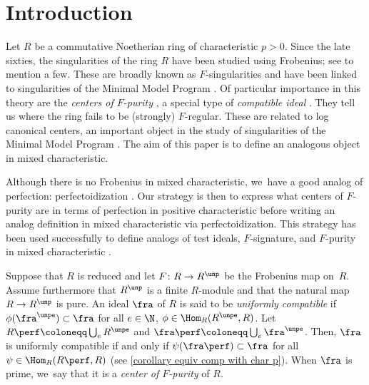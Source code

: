 \section{Introduction}

Let $R$ be a commutative Noetherian ring of characteristic $p>0$. Since the late sixties, the singularities of the ring $R$ have been studied using Frobenius; see \cite{KunzCharacterizationsOfRegularLocalRings,HochsterHunekeTC1,HochsterFoundations,HochsterHunekeTightClosureAndStrongFRegularity,SmithFRatImpliesRat,MehtaRamanathanFrobeniusSplittingAndCohomologyVanishing} to mention a few.
These are broadly known as $F$-singularities and have been linked to singularities of the Minimal Model Program \cite{SchwedeFInjectiveAreDuBois,SmithFRatImpliesRat,SmithMultiplierTestIdeals}.
Of particular importance in this theory are the \emph{centers of $F$-purity} \cite{SchwedeCentersOfFPurity}, a special type of \emph{compatible ideal} \cite{MehtaRamanathanFrobeniusSplittingAndCohomologyVanishing}. They tell us where the ring fails to be (strongly) $F$-regular.
These are related to log canonical centers, an important object in the study of singularities of the Minimal Model Program \cite{AmbroLCCENTERS}.
The aim of this paper is to define an analogous object in mixed characteristic.

Although there is no Frobenius in mixed characteristic, we~have a good analog of perfection: perfectoidization \cite{ScholzePerfectoidSpaces,BhattScholzePrisms}. Our strategy is then to express what centers of $F$-purity are in terms of perfection in positive characteristic before writing an analog definition in mixed characteristic via perfectoidization. This strategy has been used successfully to define analogs of test ideals, $F$-signature, and $F$-purity in mixed characteristic \cite{MaSchwedePerfectoidTestIdeal,CaiLeeMaSchwedeTuckerPerfectoidSignature,BMPSTWWPerfectoidPure}.

Suppose that $R$ is reduced and let $F\colon R\to R^\unp$ be the Frobenius map on~$R$. Assume furthermore that $R^\unp$ is a finite $R$\nobreakdash-module and that the natural map \hbox{$R\to R^\unp$} is pure. An ideal $\fra$ of $R$ is said to be \emph{uniformly compatible} if $\phi(\fra^\unpe)\subset \fra$ for all $e\in \N$, $\phi\in \Hom_R(R^\unpe,R)$. Let $R\perf\coloneqq \bigcup_e R^\unpe$ and $\fra\perf\coloneqq \bigcup_e \fra^\unpe$. Then, $\fra$ is uniformly compatible if and only if $\psi(\fra\perf)\subset \fra$ for all $\psi\in \Hom_R(R\perf,R)$
(see \autoref{corollary equiv comp with char p}).
When $\fra$ is prime, we~say that it is a \emph{center of $F$-purity} of $R$.

